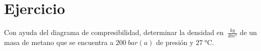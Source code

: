 \section{Ejercicio}\label{ej:Chap03Ejercicio12}
Con ayuda del diagrama de compresibilidad, determinar la densidad en $\SI{}{\frac{kg}{dm^3}}$ de un masa de metano que se encuentra a $\SI{200}{bar(a)}$ de presión y $\SI{27}{\celsius}$.